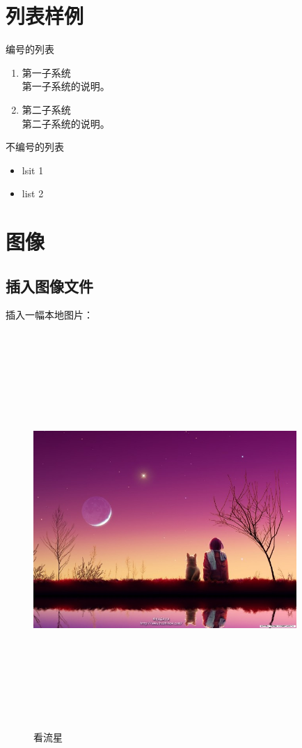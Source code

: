 \documentclass[a4paper,12pt]{article} %
\begin{document}
 
 \section{列表样例}
 编号的列表
 \begin{enumerate}
  \item 第一子系统\\
  第一子系统的说明。
  \item 第二子系统\\
  第二子系统的说明。
 \end{enumerate}

 不编号的列表
 \begin{itemize} %
 \item lsit 1
 \item list 2
 \end{itemize}
 

\section{图像}

\subsection{插入图像文件}
插入一幅本地图片：\\
\begin{figure}[htbp] %
  \centering
  \includegraphics[width=10cm,height=15cm,keepaspectratio]{pic1.jpg}
  \caption{看流星}
  \label{fig:star1}
\end{figure}
\end{document}

